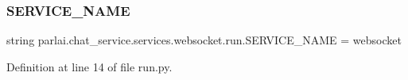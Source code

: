 \subsubsection{\texorpdfstring{S\+E\+R\+V\+I\+C\+E\+\_\+\+N\+A\+ME}{SERVICE\_NAME}}
{\footnotesize\ttfamily string parlai.\+chat\+\_\+service.\+services.\+websocket.\+run.\+S\+E\+R\+V\+I\+C\+E\+\_\+\+N\+A\+ME = \textquotesingle{}websocket\textquotesingle{}}



Definition at line 14 of file run.\+py.

